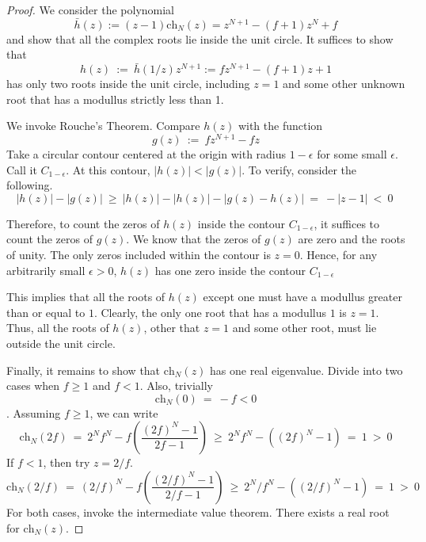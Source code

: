\documentclass{article}
\numberwithin{equation}{section}
\newcommand{\ch}{\text{ch}}
\begin{document}
\begin{proof}
    We consider the polynomial 
    \[
        \bar h(z) := (z - 1) \ch_N(z) = z^{N+1} - (f + 1)z^N + f
    \]
    and show that all the complex roots lie inside the unit circle. 
    It suffices to show that 
    \[
        h(z) \ :=\ \bar h (1/z) z^{N + 1} := fz^{N + 1} - (f+1)z+1
    \]
    has only two roots inside the unit circle, including $z = 1$ and 
    some other unknown root that has a modullus strictly less than 1. 

    We invoke Rouche's Theorem. Compare $h(z)$ with the function 
\[
    g(z) \ :=\ fz^{N + 1} - f z
\]
    Take a circular contour centered at the origin 
    with radius $1 - \epsilon$ for some small $\epsilon$. Call it $C_{1 - \epsilon}$. 
    At this contour, $|h(z)| < |g(z)|$. To verify, consider the following. 
    \[
        |h(z)| - |g(z)| \ \geq\  |h(z)| - |h(z)| - |g(z) - h(z)| 
        \ =  \ - |z - 1| \ < \ 0\ 
    \]

    Therefore, to count the zeros of $h(z)$ inside the contour $C_{1 - \epsilon}$, 
    it suffices to count the zeros of $g(z)$. We know that the zeros of $g(z)$
    are zero and the roots of unity. The only zeros included within the 
    contour is $z = 0$. Hence, for any arbitrarily small $\epsilon > 0$, $h(z)$
    has one zero inside the contour $C_{1 - \epsilon}$

    This implies that all the roots of $h(z)$ except one must have 
    a modullus greater than or equal to $1$. Clearly, the only 
    one root that has a modullus $1$ is $z = 1$. Thus, 
    all the roots of $h(z)$, other that $z = 1$ and some other root, 
    must lie outside the unit circle. 

    Finally, it remains to show that $\ch_N(z)$ has one 
    real eigenvalue. Divide into two cases when $f \geq 1$ 
    and $f < 1$. Also, trivially 
    \[
        \ch_N(0) \ =\ -f < 0    
    \]. Assuming $f \geq 1$, we can write 
    \[
        \ch_N(2f)\ =\ 2^N f^N  -  f \left(
            \frac {(2f)^N - 1} {2f - 1}
        \right) \
        \geq \  2^Nf^N - ((2f)^N - 1) \ = \  1 \ > \ 0
    \]
    If $f < 1$, then try $z = 2/f$. 
    \[
        \ch_N(2/f) \ = \ (2/f)^N - f \left(
            \frac{(2/f)^N - 1}{2/f - 1}
        \right)
        \ \geq \ 
  2^N/f^N - ((2/f)^N - 1) \ = \  1 \ > \ 0
    \]
For both cases, invoke the intermediate value theorem. There 
    exists a real root for $\ch_N(z)$. 

\end{proof}
\end{document}

